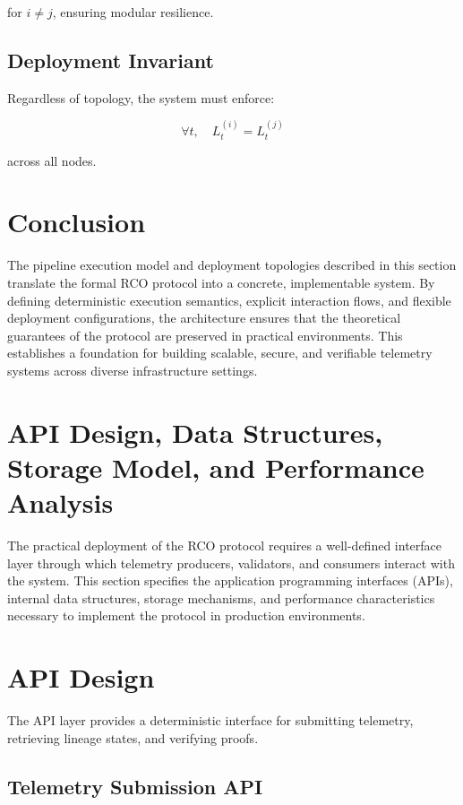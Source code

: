 for $i \neq j$, ensuring modular resilience.

\subsection{Deployment Invariant}

Regardless of topology, the system must enforce:

\begin{equation}
\forall t, \quad L_t^{(i)} = L_t^{(j)}
\end{equation}

across all nodes.

\section{Conclusion}

The pipeline execution model and deployment topologies described in this section translate the formal RCO protocol into a concrete, implementable system. By defining deterministic execution semantics, explicit interaction flows, and flexible deployment configurations, the architecture ensures that the theoretical guarantees of the protocol are preserved in practical environments. This establishes a foundation for building scalable, secure, and verifiable telemetry systems across diverse infrastructure settings.

\section{API Design, Data Structures, Storage Model, and Performance Analysis}

The practical deployment of the RCO protocol requires a well-defined interface layer through which telemetry producers, validators, and consumers interact with the system. This section specifies the application programming interfaces (APIs), internal data structures, storage mechanisms, and performance characteristics necessary to implement the protocol in production environments.

\section{API Design}

The API layer provides a deterministic interface for submitting telemetry, retrieving lineage states, and verifying proofs.

\subsection{Telemetry Submission API}

